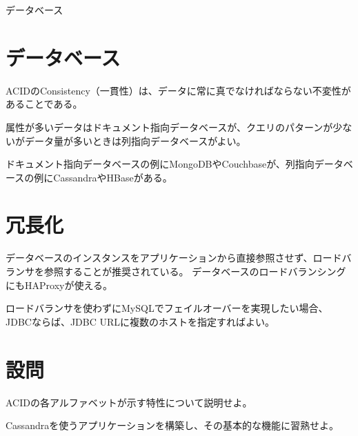 \documentclass[book]{jlreq}
\begin{document}
\begin{chapter-bib}{データベース}
  \section{データベース}
  ACIDのConsistency（一貫性）は、データに常に真でなければならない不変性があることである\cite{ddia}。
  
  属性が多いデータはドキュメント指向データベースが、クエリのパターンが少ないがデータ量が多いときは列指向データベースがよい\cite{lc-databases}。
  
  ドキュメント指向データベースの例にMongoDBやCouchbaseが、列指向データベースの例にCassandraやHBaseがある。
  \section{冗長化}
  データベースのインスタンスをアプリケーションから直接参照させず、ロードバランサを参照することが推奨されている\cite{cs75}。
  データベースのロードバランシングにもHAProxyが使える\cite{haproxyMySQL}。
  
  ロードバランサを使わずにMySQLでフェイルオーバーを実現したい場合、JDBCならば、JDBC URLに複数のホストを指定すればよい\cite{MySQLJDBC}。
  \section{設問}
  \begin{exercise}
  \item ACIDの各アルファベットが示す特性について説明せよ。
  \item Cassandraを使うアプリケーションを構築し、その基本的な機能に習熟せよ。
  \end{exercise}
\end{chapter-bib}
\end{document}
